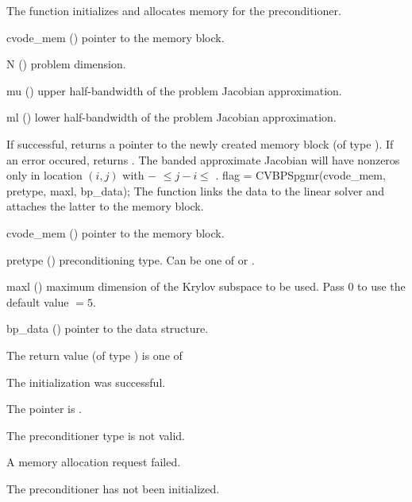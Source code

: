 {
  The function  initializes and allocates
  memory for the {\cvbandpre} preconditioner.
}
{
  \begin{args}
  \item[cvode\_mem] ()
    pointer to the {\cvode} memory block.
  \item[N] ()
    problem dimension.
  \item[mu] ()
    upper half-bandwidth of the problem Jacobian approximation.
  \item[ml] ()
    lower half-bandwidth of the problem Jacobian approximation.
  \end{args}
}
{
  If successful,  returns a pointer to the newly created 
  {\cvbandpre} memory block (of type ).
  If an error occured,  returns .
}
{
  The banded approximate Jacobian will have nonzeros only in location $(i,j)$
  with $-$ $\leq j-i \leq$ .
}
{
  flag = CVBPSpgmr(cvode\_mem, pretype, maxl, bp\_data);
}
{
  The function  links the {\cvbandpre} data to the
  {\cvspgmr} linear solver and attaches the latter to the {\cvode}
  memory block.
}
{
  \begin{args}
  \item[cvode\_mem] ()
    pointer to the {\cvode} memory block.
  \item[pretype] ()
    preconditioning type. Can be one of  or .
  \item[maxl] ()
    maximum dimension of the Krylov subspace to be used. Pass $0$ to use the 
    default value $=5$.
  \item[bp\_data] ()
    pointer to the {\cvbandpre} data structure.
  \end{args}
}
{
  The return value  (of type ) is one of
  \begin{args}
  \item[\Id{SUCCESS}] 
    The {\cvspgmr} initialization was successful.
  \item[\Id{LIN\_NO\_MEM}]
    The  pointer is .
  \item[\Id{LIN\_ILL\_INPUT}]
    The preconditioner type  is not valid.
  \item[\Id{LMEM\_FAIL}]
    A memory allocation request failed.
  \item[\Id{BP\_NO\_DATA}]
    The {\cvbandpre} preconditioner has not been initialized.
  \end{args}
}
